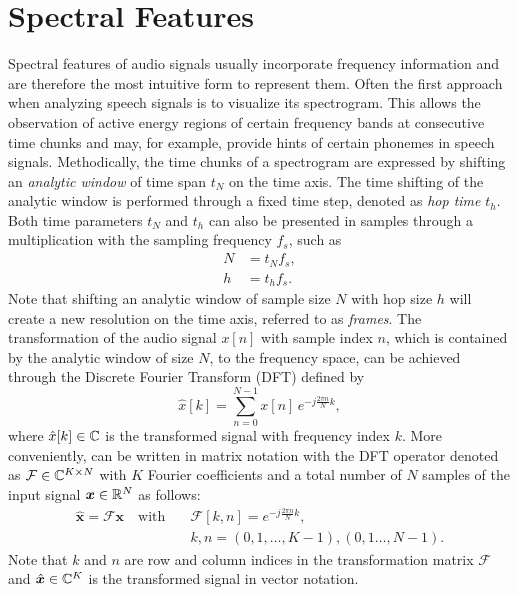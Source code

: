 
\section{Spectral Features}\label{sec:signal_spec}
Spectral features of audio signals usually incorporate frequency information and are therefore the most intuitive form to represent them.
Often the first approach when analyzing speech signals is to visualize its spectrogram.
This allows the observation of active energy regions of certain frequency bands at consecutive time chunks and may, for example, provide hints of certain phonemes in speech signals.
Methodically, the time chunks of a spectrogram are expressed by shifting an \emph{analytic window} of time span $t_N$ on the time axis.
The time shifting of the analytic window is performed through a fixed time step, denoted as \emph{hop time} $t_{h}$.
Both time parameters $t_N$ and $t_h$ can also be presented in samples through a multiplication with the sampling frequency $f_s$, such as
\begin{equation}
  \begin{split}
    N &= t_N f_s, \\
    h &= t_h f_s.
  \end{split}
\end{equation}
Note that shifting an analytic window of sample size $N$ with hop size $h$ will create a new resolution on the time axis, referred to as \emph{frames}.
The transformation of the audio signal $x[n]$ with sample index $n$, which is contained by the analytic window of size $N$, to the frequency space, can be achieved through the Discrete Fourier Transform (DFT) defined by
\begin{equation}\label{eq:signal_spec_dtft}
  \hat{x}[k] = \sum_{n=0}^{N-1} x[n] \, e^{-j\frac{2 \pi n}{N}k},
\end{equation}
where $\hat{x}[k] \in \mathbb{C}$ is the transformed signal with frequency index $k$.
More conveniently,  can be written in matrix notation with the DFT operator denoted as $\mathcal{F} \in \mathbb{C}^{K \times N}$ with $K$ Fourier coefficients and a total number of $N$ samples of the input signal $\bm{x} \in \mathbb{R}^N$  as follows:
\begin{equation}\label{eq:signal_spec_dtft_matrix}
  \begin{aligned}
    \hat{\bm{x}} = \mathcal{F} \bm{x} \quad \mathrm{with} 
    \quad &\mathcal{F}[k, n] = e^{-j\frac{2 \pi n}{N} k},\\
    &k, n = (0, 1, \dots, K-1), (0, 1 \dots, N-1).
  \end{aligned}
\end{equation}
Note that $k$ and $n$ are row and column indices in the transformation matrix $\mathcal{F}$ and $\hat{\bm{x}} \in \mathbb{C}^K$ is the transformed signal in vector notation.

